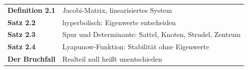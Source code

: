 \begin{merksatz}
\begin{center}
\renewcommand{\arraystretch}{1.5}
\begin{tabular}{@{}P{3.0cm}P{5.6cm}@{}}
\toprule
\textbf{Definition 2.1} & Jacobi-Matrix, linearisiertes System\\
\textbf{Satz 2.2} & hyperbolisch: Eigenwerte entscheiden\\
\textbf{Satz 2.3} & Spur und Determinante: Sattel, Knoten, Strudel, Zentrum\\
\textbf{Satz 2.4} & Lyapunow-Funktion: Stabilität ohne Eigenwerte\\
\textbf{Der Bruchfall} & Realteil null heißt unentschieden\\
\bottomrule
\end{tabular}
\end{center}

\begin{center}
\begin{minipage}{0.88\textwidth}
\end{minipage}
\end{center}
\end{merksatz}
